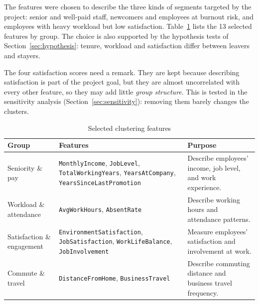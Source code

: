 \documentclass[12pt,a4paper]{article}
\begin{document}
The features were chosen to describe the three kinds of segments targeted by
the project: senior and well-paid staff, newcomers and employees at burnout
risk, and employees with heavy workload but low satisfaction.
Table~\ref{tab:features} lists the 13 selected features by group. The
choice is also supported by the hypothesis tests of
Section~\ref{sec:hypothesis}: tenure, workload and satisfaction differ
between leavers and stayers.

The four satisfaction scores need a remark. They are kept because describing
satisfaction is part of the project goal, but they are almost uncorrelated
with every other feature, so they may add little \emph{group structure}. This
is tested in the sensitivity analysis (Section~\ref{sec:sensitivity}):
removing them barely changes the clusters.

\begin{table}[H]
\centering
\caption{Selected clustering features}
\label{tab:features}
\small
\begin{tabularx}{\textwidth}{
  >{\raggedright\arraybackslash}p{3.6cm}
  >{\raggedright\arraybackslash}X
  >{\raggedright\arraybackslash}X}
\toprule
\textbf{Group} & \textbf{Features} & \textbf{Purpose}\\
\midrule

Seniority \& pay
& \texttt{MonthlyIncome}, \texttt{JobLevel},
  \texttt{TotalWorkingYears}, \texttt{YearsAtCompany},
  \texttt{YearsSinceLastPromotion}
& Describe employees' income, job level, and work experience.\\

Workload \& attendance
& \texttt{AvgWorkHours}, \texttt{AbsentRate}
& Describe working hours and attendance patterns.\\

Satisfaction \& engagement
& \texttt{EnvironmentSatisfaction}, \texttt{JobSatisfaction},
  \texttt{WorkLifeBalance}, \texttt{JobInvolvement}
& Measure employees' satisfaction and involvement at work.\\

Commute \& travel
& \texttt{DistanceFromHome}, \texttt{BusinessTravel}
& Describe commuting distance and business travel frequency.\\

\bottomrule
\end{tabularx}
\end{table}
\end{document}
